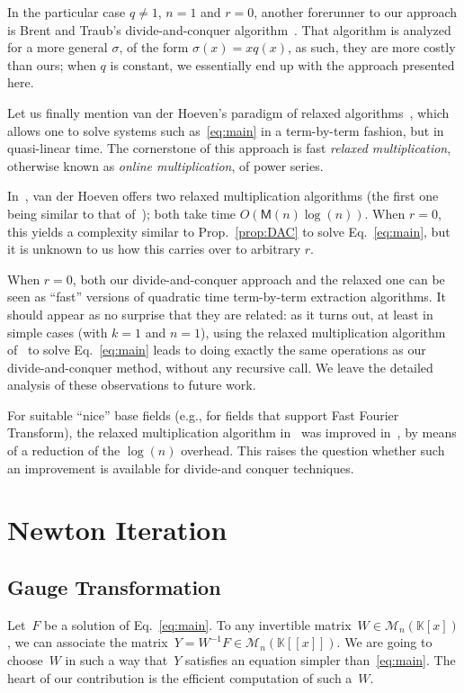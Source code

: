 \documentclass[]{sig-alternate}
\def\K {\ensuremath{\mathbb{K}}}
\def\M {\ensuremath{\mathsf{M}}}
\def\mF {\ensuremath{{F}}}
\def\mW {\ensuremath{{W}}}
\def\mY {\ensuremath{{Y}}}
\begin{document}
In the particular case $q\ne 1$, $n=1$ and $r=0$, another forerunner
to our approach is Brent and Traub's divide-and-conquer
algorithm~\cite{BrTr80}. That algorithm is analyzed for a more general
$\sigma$, of the form $\sigma(x)=xq(x)$, as such, they are more costly
than ours; when $q$ is constant, we essentially end up with the
approach presented here.

Let us finally mention van der Hoeven's paradigm of {\rm relaxed
  algorithms}~\cite{Hoeven2002,Hoeven09,Hoeven11}, which allows one to
solve systems such as~\eqref{eq:main} in a term-by-term fashion, but
in quasi-linear time. The cornerstone of this approach is fast {\em
  relaxed multiplication}, otherwise known as {\em online multiplication},
of power series. 

In~\cite{Hoeven2002,Hoeven2003}, van der Hoeven offers two relaxed
multiplication algorithms (the first one being similar to that
of~\cite{FischerStockmeyer1974}); both take time $O(\M(n)\log(n))$.
When $r=0$, this yields a complexity similar to Prop.~\ref{prop:DAC}
to solve Eq.~\eqref{eq:main}, but it is unknown to us how this
carries over to arbitrary $r$.

When $r=0$, both our divide-and-conquer approach and the relaxed one
can be seen as ``fast'' versions of quadratic time term-by-term
extraction algorithms. It should appear as no surprise that they
are related: as it turns out, at least in simple cases (with $k=1$ and
$n=1$),  using the relaxed multiplication algorithm
of~\cite{Hoeven2003} to solve Eq.~\eqref{eq:main} leads to doing
exactly the same operations as our divide-and-conquer method, without
any recursive call. We leave
the detailed analysis of these observations to future work.

For suitable ``nice'' base fields (e.g., for fields that support Fast
Fourier Transform), the relaxed multiplication algorithm
in~\cite{Hoeven2002} was improved in~\cite{Hoeven2007,Hoeven12}, by
means of a reduction of the $\log(n)$ overhead. This raises the
question whether such an improvement is available for divide-and
conquer techniques.




\section{Newton Iteration}\label{sec:Newton}

\subsection{Gauge Transformation}\label{ssec:mF}
Let~$\mF$ be a solution of Eq.~\eqref{eq:main}.  To any invertible
matrix~$\mW\in\mathscr{M}_n(\K[x])$, we can associate the
matrix~$\mY=\mW^{-1}F\in\mathscr{M}_n({\K[[x]]})$. We are going to
choose~$\mW$ in such a way that~$\mY$ satisfies an equation simpler
than~\eqref{eq:main}. The heart of our contribution is the efficient
computation of such a~$\mW$.
\end{document}
